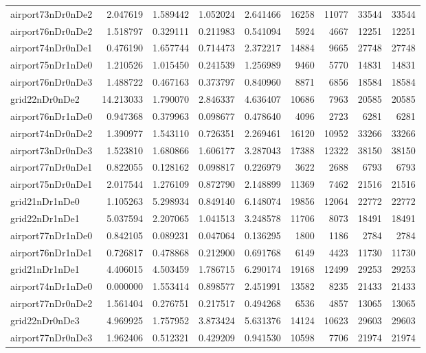 \begin{longtable}{|l|r|r|r|r|r|r|r|r|}
airport73nDr0nDe2 & 2.047619 & 1.589442 & 1.052024 & 2.641466 & 16258 & 11077 & 33544 & 33544 \\
airport76nDr0nDe2 & 1.518797 & 0.329111 & 0.211983 & 0.541094 & 5924 & 4667 & 12251 & 12251 \\
airport74nDr0nDe1 & 0.476190 & 1.657744 & 0.714473 & 2.372217 & 14884 & 9665 & 27748 & 27748 \\
airport75nDr1nDe0 & 1.210526 & 1.015450 & 0.241539 & 1.256989 & 9460 & 5770 & 14831 & 14831 \\
airport76nDr0nDe3 & 1.488722 & 0.467163 & 0.373797 & 0.840960 & 8871 & 6856 & 18584 & 18584 \\
grid22nDr0nDe2 & 14.213033 & 1.790070 & 2.846337 & 4.636407 & 10686 & 7963 & 20585 & 20585 \\
airport76nDr1nDe0 & 0.947368 & 0.379963 & 0.098677 & 0.478640 & 4096 & 2723 & 6281 & 6281 \\
airport74nDr0nDe2 & 1.390977 & 1.543110 & 0.726351 & 2.269461 & 16120 & 10952 & 33266 & 33266 \\
airport73nDr0nDe3 & 1.523810 & 1.680866 & 1.606177 & 3.287043 & 17388 & 12322 & 38150 & 38150 \\
airport77nDr0nDe1 & 0.822055 & 0.128162 & 0.098817 & 0.226979 & 3622 & 2688 & 6793 & 6793 \\
airport75nDr0nDe1 & 2.017544 & 1.276109 & 0.872790 & 2.148899 & 11369 & 7462 & 21516 & 21516 \\
grid21nDr1nDe0 & 1.105263 & 5.298934 & 0.849140 & 6.148074 & 19856 & 12064 & 22772 & 22772 \\
grid22nDr1nDe1 & 5.037594 & 2.207065 & 1.041513 & 3.248578 & 11706 & 8073 & 18491 & 18491 \\
airport77nDr1nDe0 & 0.842105 & 0.089231 & 0.047064 & 0.136295 & 1800 & 1186 & 2784 & 2784 \\
airport76nDr1nDe1 & 0.726817 & 0.478868 & 0.212900 & 0.691768 & 6149 & 4423 & 11730 & 11730 \\
grid21nDr1nDe1 & 4.406015 & 4.503459 & 1.786715 & 6.290174 & 19168 & 12499 & 29253 & 29253 \\
airport74nDr1nDe0 & 0.000000 & 1.553414 & 0.898577 & 2.451991 & 13582 & 8235 & 21433 & 21433 \\
airport77nDr0nDe2 & 1.561404 & 0.276751 & 0.217517 & 0.494268 & 6536 & 4857 & 13065 & 13065 \\
grid22nDr0nDe3 & 4.969925 & 1.757952 & 3.873424 & 5.631376 & 14124 & 10623 & 29603 & 29603 \\
airport77nDr0nDe3 & 1.962406 & 0.512321 & 0.429209 & 0.941530 & 10598 & 7706 & 21974 & 21974 \\

\end{longtable}

